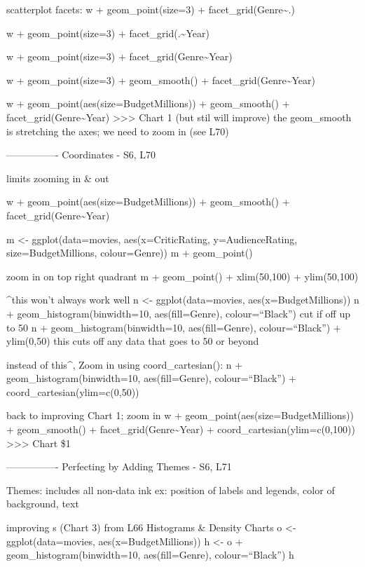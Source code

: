 \documentclass[]{article}
\begin{document}
scatterplot facets: w + geom\_point(size=3) +
facet\_grid(Genre\textasciitilde{}.)

w + geom\_point(size=3) + facet\_grid(.\textasciitilde{}Year)

w + geom\_point(size=3) + facet\_grid(Genre\textasciitilde{}Year)

w + geom\_point(size=3) + geom\_smooth() +
facet\_grid(Genre\textasciitilde{}Year)

w + geom\_point(aes(size=BudgetMillions)) + geom\_smooth() +
facet\_grid(Genre\textasciitilde{}Year)
\textgreater{}\textgreater{}\textgreater{} Chart 1 (but stil will
improve) the geom\_smooth is stretching the axes; we need to zoom in
(see L70)

---------------- Coordinates - S6, L70

limits zooming in \& out

w + geom\_point(aes(size=BudgetMillions)) + geom\_smooth() +
facet\_grid(Genre\textasciitilde{}Year)

m \textless{}- ggplot(data=movies, aes(x=CriticRating, y=AudienceRating,
size=BudgetMillions, colour=Genre)) m + geom\_point()

zoom in on top right quadrant m + geom\_point() + xlim(50,100) +
ylim(50,100)

\^{}this won't always work well n \textless{}- ggplot(data=movies,
aes(x=BudgetMillions)) n + geom\_histogram(binwidth=10, aes(fill=Genre),
colour=``Black'') cut if off up to 50 n + geom\_histogram(binwidth=10,
aes(fill=Genre), colour=``Black'') + ylim(0,50) this cuts off any data
that goes to 50 or beyond

instead of this\^{}, Zoom in using coord\_cartesian(): n +
geom\_histogram(binwidth=10, aes(fill=Genre), colour=``Black'') +
coord\_cartesian(ylim=c(0,50))

back to improving Chart 1; zoom in w +
geom\_point(aes(size=BudgetMillions)) + geom\_smooth() +
facet\_grid(Genre\textasciitilde{}Year) +
coord\_cartesian(ylim=c(0,100))
\textgreater{}\textgreater{}\textgreater{} Chart \$1

---------------- Perfecting by Adding Themes - S6, L71

Themes: includes all non-data ink ex: position of labels and legends,
color of background, text

improving s (Chart 3) from L66 Histograms \& Density Charts o
\textless{}- ggplot(data=movies, aes(x=BudgetMillions)) h \textless{}- o
+ geom\_histogram(binwidth=10, aes(fill=Genre), colour=``Black'') h
\end{document}
